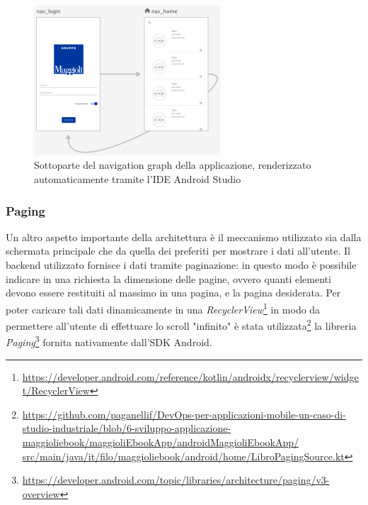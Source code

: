 \begin{figure}[H]
    \centering
    \includegraphics[width=0.62\textwidth]{img/android-nav-graph.png}
    \caption{Sottoparte del navigation graph della applicazione, renderizzato automaticamente tramite l'IDE Android Studio}
    \label{android-nav-graph-png}
\end{figure}

\subsubsection*{Paging}
\label{pagingsec}
Un altro aspetto importante della architettura è il meccanismo utilizzato sia dalla schermata principale che da quella dei preferiti per mostrare i dati all'utente. Il backend utilizzato fornisce i dati tramite paginazione: in questo modo è possibile indicare in una richiesta la dimensione delle pagine, ovvero quanti elementi devono essere restituiti al massimo in una pagina, e la pagina desiderata. Per poter caricare tali dati dinamicamente in una \textit{RecyclerView}\footnote{\href{https://developer.android.com/reference/kotlin/androidx/recyclerview/widget/RecyclerView}{https://developer.android.com/reference/kotlin/androidx/recyclerview/widget/RecyclerView}} in modo da permettere all'utente di effettuare lo scroll "infinito" è stata utilizzata\footnote{\href{https://github.com/paganellif/DevOps-per-applicazioni-mobile-un-caso-di-studio-industriale/blob/6-sviluppo-applicazione-maggioliebook/maggioliEbookApp/androidMaggioliEbookApp/src/main/java/it/filo/maggioliebook/android/home/LibroPagingSource.kt}{https://github.com/paganellif/DevOps-per-applicazioni-mobile-un-caso-di-studio-industriale/blob/6-sviluppo-applicazione-maggioliebook/maggioliEbookApp/androidMaggioliEbookApp/\\src/main/java/it/filo/maggioliebook/android/home/LibroPagingSource.kt}} la libreria \textit{Paging}\footnote{\href{https://developer.android.com/topic/libraries/architecture/paging/v3-overview}{https://developer.android.com/topic/libraries/architecture/paging/v3-overview}} fornita nativamente dall'SDK Android.

